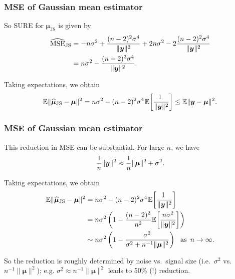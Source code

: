 \documentclass[18pt, handout]{beamer}
\newcommand{\defineTightSpacing}{%
	\setlength{\abovedisplayskip}{.25\baselineskip}%
	\setlength{\belowdisplayskip}{.25\baselineskip}%
}
\renewcommand{\textsc}[1]{{\small \MakeUppercase{#1}}}
\newcommand{\thinnerspace}{\mskip.5\thinmuskip}
\newcommand{\expectation}{\mathbb{E}}
\newcommand{\by}{\bm{y}}
\newcommand{\bmu}{\bm{\mu}}
\begin{document}
\begin{frame}
\frametitle{M{\normalsize SE} of Gaussian mean estimator}
So \textsc{SURE} for $\widehat{\bmu}_{\mathrm{JS}}$ is given by
\begin{equation*} \defineTightSpacing%
\begin{aligned}
\widehat{\operatorname{MSE}}_{\mathrm{JS}}
	&= - n \sigma^2 
		+ \frac{(n - 2)^2 \sigma^4}{\| \by \|^2}
		+ 2 n \sigma^2 
		- 2 \frac{(n - 2)^2 \sigma^4}{\| \by \|^2} \\
	&= n \sigma^2 - \frac{(n - 2)^2 \sigma^4}{\| \by \|^2}.
\end{aligned}
\end{equation*}

Taking expectations, we obtain
\begin{equation*} \defineTightSpacing%
\expectation \| \widehat{\bmu}_{\mathrm{JS}} - \bmu \|^2 
	= n \sigma^2  - (n - 2)^2 \sigma^4 \thinnerspace \expectation\!\left[ \frac{\!\!1}{\| \by \|^2} \right] 
	\leq \expectation \| \by - \bmu \|^2.
\end{equation*}
\end{frame}

\begin{frame}
\frametitle{M{\normalsize SE} of Gaussian mean estimator}
This reduction in \textsc{MSE} can be substantial.
For large $n$, we have
\begin{equation*} \defineTightSpacing%
\frac{1}{n} \| \by \|^2 \approx \frac{1}{n} \| \bmu \|^2 + \sigma^2.
\end{equation*}

Taking expectations, we obtain
\begin{equation*} \defineTightSpacing%
\begin{aligned}
\expectation \| \widehat{\bmu}_{\mathrm{JS}} - \bmu \|^2 
	&= n \sigma^2  - (n - 2)^2 \sigma^4 \thinnerspace \expectation\!\left[ \frac{\!\!1}{\| \by \|^2} \right] \\
	&= n \sigma^2 \left(
		1 - \frac{(n - 2)^2}{n^2} \expectation\!\left[ \frac{n \sigma^2}{\| \by \|^2} \right] 
	\right) \\
	&\sim n \sigma^2 \left(
		1 - \frac{\sigma^2}{\sigma^2 + n^{-1} \| \bmu \|^2} 
	\right)
	\ \text{ as } \, n \to \infty.
\end{aligned}
\end{equation*}

So the reduction is roughly determined by noise vs.\ signal size (i.e.\ $\sigma^2$ vs.\ $n^{-1} \| \bmu \|^2$);
e.g.  $\sigma^2 \approx n^{-1} \| \bmu \|^2$ leads to 50\% (!) reduction. 
\end{frame}
\end{document}
